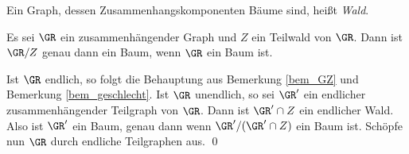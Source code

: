 \DEF Ein Graph, dessen Zusammenhangskomponenten Bäume sind,
heißt \emph{Wald}.

\PROP\label{prop_wald}
Es sei $\GR$ ein zusammenhängender Graph und $Z$ ein Teilwald
von $\GR$. Dann ist $\GR/Z$ genau dann ein Baum, wenn $\GR$ ein
Baum ist.

\bew Ist $\GR$ endlich, so folgt die Behauptung aus Bemerkung
\ref{bem_GZ} und Bemerkung \ref{bem_geschlecht}.
Ist $\GR$ unendlich, so sei $\GR'$ ein endlicher zusammenhängender
Teilgraph von $\GR$. Dann ist $\GR'\cap Z$ ein endlicher Wald.
Also ist $\GR'$ ein Baum, genau dann wenn $\GR'/(\GR'\cap Z)$ ein Baum
ist. Schöpfe nun $\GR$ durch endliche Teilgraphen aus.
\qed

